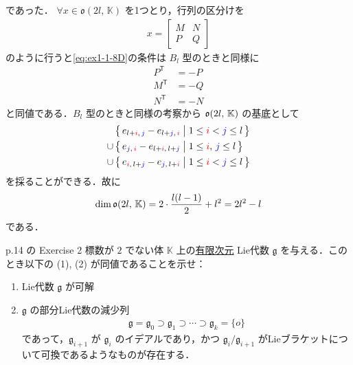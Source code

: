 \documentclass{ltjsarticle}
\theoremstyle{mystyle} %
\numberwithin{equation}{section}
\begin{document}
\begin{description}
    であった．
    $\forall x \in \mathfrak{o} (2l,\, \mathbb{K})$ を1つとり，行列の区分けを
    \begin{align}
        x = \left[
            \begin{array}{cc}
                M & N \\  
                P & Q 
            \end{array}
        \right]
    \end{align}
    のように行うと\eqref{eq:ex1-1-8D}の条件は $B_l$ 型のときと同様に
    \begin{align}
        P^{\mathsf{T}} &= -P  \\
        M^{\mathsf{T}} &= -Q \\
        N^{\mathsf{T}} &= -N
    \end{align}
    と同値である．$B_l$ 型のときと同様の考察から $\mathfrak{o} (2l,\, \mathbb{K})$ の基底として
    \begin{align}
        &\bigl\{\, e_{l + \textcolor{red}{i},\, \textcolor{blue}{j}} - e_{l + \textcolor{blue}{j},\, \textcolor{red}{i}} \bigm| 1 \le \textcolor{red}{i} < \textcolor{blue}{j} \le l \,\bigr\} \\
        \cup\, &\bigl\{\, e_{\textcolor{blue}{j},\, \textcolor{red}{i}} - e_{l + \textcolor{red}{i},\, l + \textcolor{blue}{j}} \bigm| 1 \le \textcolor{red}{i},\, \textcolor{blue}{j} \le l \,\bigr\}  \\
        \cup\, &\bigl\{\, e_{\textcolor{red}{i},\, l + \textcolor{blue}{j}} - e_{\textcolor{blue}{j},\, l + \textcolor{red}{i}} \bigm| 1 \le \textcolor{red}{i} < \textcolor{blue}{j} \le l \,\bigr\} 
    \end{align}
    を採ることができる．故に
    \begin{align}
        \dim \mathfrak{o} (2l,\, \mathbb{K}) = 2 \cdot \frac{l (l-1)}{2} + l^2 = 2l^2 - l
    \end{align}
    である．
\end{description}


\begin{myproblem}[label=ex:1-3-8]{p.14 の Exercise 2}
    標数が $2$ でない体 $\mathbb{K}$ 上の\underline{有限次元} Lie代数 $\mathfrak{g}$ を与える．このとき以下の (1), (2) が同値であることを示せ：
    \begin{enumerate}
        \item Lie代数 $\mathfrak{g}$ が可解 
        \item $\mathfrak{g}$ の部分Lie代数の減少列
        \begin{align}
            \mathfrak{g} = \mathfrak{g}_0 \supset \mathfrak{g}_1 \supset \cdots \supset \mathfrak{g}_k = \{o\}
        \end{align}
        であって，$\mathfrak{g}_{i+1}$ が $\mathfrak{g}_i$ のイデアルであり，かつ $\mathfrak{g}_i / \mathfrak{g}_{i+1}$ がLieブラケットについて可換であるようなものが存在する．
    \end{enumerate}
\end{myproblem}
\end{document}
